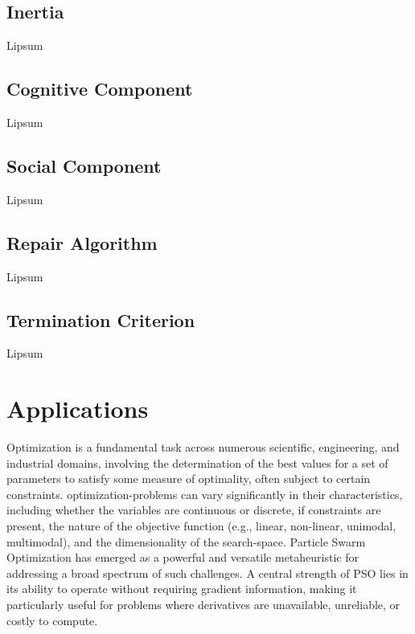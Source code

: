{\subsection{Inertia}

Lipsum

\subsection{Cognitive Component}

Lipsum

\subsection{Social Component}

Lipsum

\subsection{Repair Algorithm}

Lipsum

\subsection{Termination Criterion}

Lipsum




\section{Applications}

Optimization is a fundamental task across numerous scientific, engineering, and industrial domains, involving the determination of the best values for a set of parameters to satisfy some measure of optimality, often subject to certain constraints. \Glspl{optimization-problem}  can vary significantly in their characteristics, including whether the variables are continuous or discrete, if constraints are present, the nature of the objective function (e.g., linear, non-linear, unimodal, multimodal), and the dimensionality of the \gls{search-space}.
Particle Swarm Optimization has emerged as a powerful and versatile metaheuristic for addressing a broad spectrum of such challenges. A central strength of PSO lies in its ability to operate without requiring gradient information, making it particularly useful for problems where derivatives are unavailable, unreliable, or costly to compute.

}
